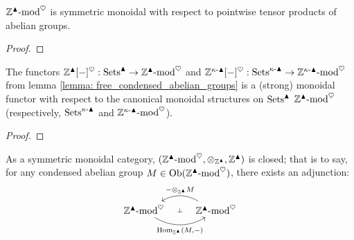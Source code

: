             \begin{lemma} \label{lemma: tensor_products_of_condensed_abelian_groups}
                $\mathbb{Z}^{\blacktriangle}\text{-}\mathrm{mod}^{\heartsuit}$ is symmetric monoidal with respect to pointwise tensor products of abelian groups.
            \end{lemma}
                \begin{proof}
                    
                \end{proof}
            \begin{proposition} \label{prop: forming_free_condensed_abelian_groups_is_monoidal}
                The functors $\mathbb{Z}^{\blacktriangle}[-]^{\heartsuit}: \mathrm{Sets}^{\blacktriangle} \to \mathbb{Z}^{\blacktriangle}\text{-}\mathrm{mod}^{\heartsuit}$ and $\mathbb{Z}^{\kappa\text{-}\blacktriangle}[-]^{\heartsuit}: \mathrm{Sets}^{\kappa\text{-}\blacktriangle} \to \mathbb{Z}^{\kappa\text{-}\blacktriangle}\text{-}\mathrm{mod}^{\heartsuit}$ from lemma \ref{lemma: free_condensed_abelian_groups} is a (strong) monoidal functor with respect to the canonical monoidal structures on $\mathrm{Sets}^{\blacktriangle}$ $\mathbb{Z}^{\blacktriangle}\text{-}\mathrm{mod}^{\heartsuit}$ (respectively, $\mathrm{Sets}^{\kappa\text{-}\blacktriangle}$ and $\mathbb{Z}^{\kappa\text{-}\blacktriangle}\text{-}\mathrm{mod}^{\heartsuit}$).
            \end{proposition}
                \begin{proof}
                    
                \end{proof}
            \begin{proposition} \label{lemma: the_category_of_condensed_abelian_groups_is_monoidally_closed}
                As a symmetric monoidal category, $(\Z^{\cond}\mod^{\heart}, \tensor_{\Z^{\cond}}, \Z^{\cond})$ is closed; that is to say, for any condensed abelian group $M \in \mathrm{Ob}(\mathbb{Z}^{\blacktriangle}\text{-}\mathrm{mod}^{\heartsuit})$, there exists an adjunction:
                    $$
                        \begin{tikzcd}
                            {\Z^{\cond}\mod^{\heart}} & {\Z^{\cond}\mod^{\heart}}
                            \arrow[""{name=0, anchor=center, inner sep=0}, "{\Hom_{\Z^{\cond}}(M, -)}"', bend right, from=1-1, to=1-2]
                            \arrow[""{name=1, anchor=center, inner sep=0}, "{- \tensor_{\Z^{\cond}} M}"', bend right, from=1-2, to=1-1]
                            \arrow["\dashv"{anchor=center, rotate=-90}, draw=none, from=1, to=0]
                        \end{tikzcd}
                    $$
            \end{proposition}
                
